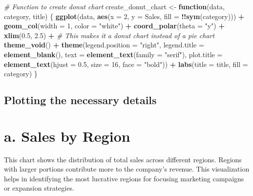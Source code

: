 \documentclass[
]{article}
\newenvironment{Shaded}{\begin{snugshade}}{\end{snugshade}}
\newcommand{\AttributeTok}[1]{\textcolor[rgb]{0.13,0.29,0.53}{#1}}
\newcommand{\CommentTok}[1]{\textcolor[rgb]{0.56,0.35,0.01}{\textit{#1}}}
\newcommand{\ControlFlowTok}[1]{\textcolor[rgb]{0.13,0.29,0.53}{\textbf{#1}}}
\newcommand{\DecValTok}[1]{\textcolor[rgb]{0.00,0.00,0.81}{#1}}
\newcommand{\FloatTok}[1]{\textcolor[rgb]{0.00,0.00,0.81}{#1}}
\newcommand{\FunctionTok}[1]{\textcolor[rgb]{0.13,0.29,0.53}{\textbf{#1}}}
\newcommand{\NormalTok}[1]{#1}
\newcommand{\OtherTok}[1]{\textcolor[rgb]{0.56,0.35,0.01}{#1}}
\newcommand{\SpecialCharTok}[1]{\textcolor[rgb]{0.81,0.36,0.00}{\textbf{#1}}}
\newcommand{\StringTok}[1]{\textcolor[rgb]{0.31,0.60,0.02}{#1}}
\begin{document}
\begin{Shaded}
\begin{Highlighting}[]
\CommentTok{\# Function to create donut chart}
\NormalTok{create\_donut\_chart }\OtherTok{\textless{}{-}} \ControlFlowTok{function}\NormalTok{(data, category, title) \{}
  \FunctionTok{ggplot}\NormalTok{(data, }\FunctionTok{aes}\NormalTok{(}\AttributeTok{x =} \DecValTok{2}\NormalTok{, }\AttributeTok{y =}\NormalTok{ Sales, }\AttributeTok{fill =} \SpecialCharTok{!!}\FunctionTok{sym}\NormalTok{(category))) }\SpecialCharTok{+} 
    \FunctionTok{geom\_col}\NormalTok{(}\AttributeTok{width =} \DecValTok{1}\NormalTok{, }\AttributeTok{color =} \StringTok{"white"}\NormalTok{) }\SpecialCharTok{+} 
    \FunctionTok{coord\_polar}\NormalTok{(}\AttributeTok{theta =} \StringTok{"y"}\NormalTok{) }\SpecialCharTok{+}
    \FunctionTok{xlim}\NormalTok{(}\FloatTok{0.5}\NormalTok{, }\FloatTok{2.5}\NormalTok{) }\SpecialCharTok{+} \CommentTok{\# This makes it a donut chart instead of a pie chart}
    \FunctionTok{theme\_void}\NormalTok{() }\SpecialCharTok{+} 
    \FunctionTok{theme}\NormalTok{(}\AttributeTok{legend.position =} \StringTok{"right"}\NormalTok{,}
          \AttributeTok{legend.title =} \FunctionTok{element\_blank}\NormalTok{(),}
          \AttributeTok{text =} \FunctionTok{element\_text}\NormalTok{(}\AttributeTok{family =} \StringTok{"serif"}\NormalTok{),}
          \AttributeTok{plot.title =} \FunctionTok{element\_text}\NormalTok{(}\AttributeTok{hjust =} \FloatTok{0.5}\NormalTok{, }\AttributeTok{size =} \DecValTok{16}\NormalTok{, }\AttributeTok{face =} \StringTok{"bold"}\NormalTok{)) }\SpecialCharTok{+}
    \FunctionTok{labs}\NormalTok{(}\AttributeTok{title =}\NormalTok{ title, }\AttributeTok{fill =}\NormalTok{ category)}
\NormalTok{\}}
\end{Highlighting}
\end{Shaded}

\hypertarget{plotting-the-necessary-details}{%
\subsection{Plotting the necessary
details}\label{plotting-the-necessary-details}}

\hypertarget{a.-sales-by-region}{%
\section{a. Sales by Region}\label{a.-sales-by-region}}

This chart shows the distribution of total sales across different
regions. Regions with larger portions contribute more to the company's
revenue. This visualization helps in identifying the most lucrative
regions for focusing marketing campaigns or expansion strategies.
\end{document}
